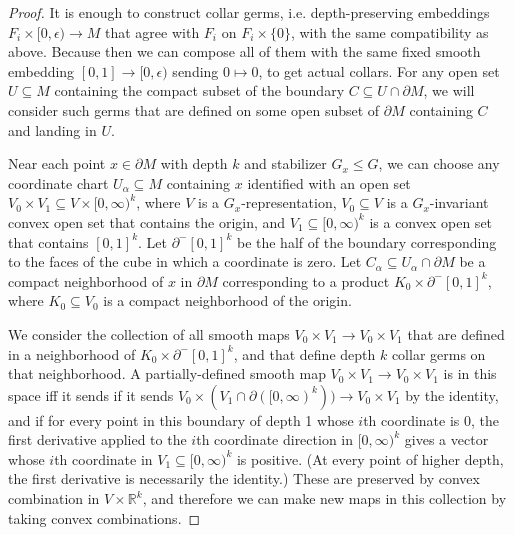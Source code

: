 \documentclass[11pt]{amsart}
\theoremstyle{definition}
\numberwithin{equation}{section}
\numberwithin{figure}{section}
\newcommand{\R}{\mathbb R}
\begin{document}
\begin{proof}
	It is enough to construct collar germs, i.e. depth-preserving embeddings $F_i \times [0,\epsilon) \to M$ that agree with $F_i$ on $F_i \times \{0\}$, with the same compatibility as above. Because then we can compose all of them with the same fixed smooth embedding $[0,1] \to [0,\epsilon)$ sending $0 \mapsto 0$, to get actual collars. For any open set $U \subseteq M$ containing the compact subset of the boundary $C \subseteq U \cap \partial M$, we will consider such germs that are defined on some open subset of $\partial M$ containing $C$ and landing in $U$.
	
	Near each point $x \in \partial M$ with depth $k$ and stabilizer $G_x \leq G$, we can choose any coordinate chart $U_\alpha \subseteq M$ containing $x$ identified with an open set $V_0 \times V_1 \subseteq V \times [0,\infty)^k$, where $V$ is a $G_x$-representation, $V_0 \subseteq V$ is a $G_x$-invariant convex open set that contains the origin, and $V_1 \subseteq [0,\infty)^k$ is a convex open set that contains $[0,1]^k$. Let $\partial^- [0,1]^k$ be the half of the boundary corresponding to the faces of the cube in which a coordinate is zero. Let $C_\alpha \subseteq U_\alpha \cap \partial M$ be a compact neighborhood of $x$ in $\partial M$ corresponding to a product $K_0 \times \partial^- [0,1]^k$, where $K_0 \subseteq V_0$ is a compact neighborhood of the origin.
	
	We consider the collection of all smooth maps $V_0 \times V_1 \to V_0 \times V_1$ that are defined in a neighborhood of $K_0 \times \partial^- [0,1]^k$, and that define depth $k$ collar germs on that neighborhood. A partially-defined smooth map $V_0 \times V_1 \to V_0 \times V_1$ is in this space iff it sends if it sends $V_0 \times (V_1 \cap \partial([0,\infty)^k)) \to V_0 \times V_1$ by the identity, and if for every point in this boundary of depth 1 whose $i$th coordinate is 0, the first derivative applied to the $i$th coordinate direction in $[0,\infty)^k$ gives a vector whose $i$th coordinate in $V_1 \subseteq [0,\infty)^k$ is positive. (At every point of higher depth, the first derivative is necessarily the identity.) These are preserved by convex combination in $V \times \R^k$, and therefore we can make new maps in this collection by taking convex combinations.
	

\end{proof}
\end{document}
